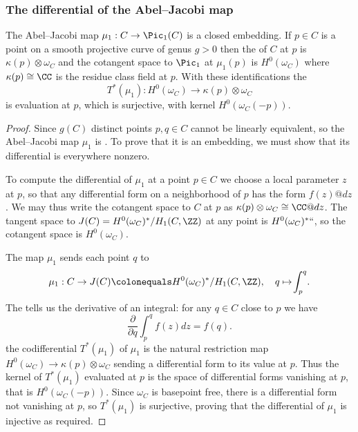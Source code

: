 \subsubsection*{The differential of the Abel--Jacobi map}

\begin{theorem}
The Abel--Jacobi map 
%
$\mu_{1}: C\to \Pic_{1}(C)$ is a closed embedding.  
If $p\in C$ is a point on a smooth projective curve of genus $g>0$ then the 
%
of $C$
at $p$ is $\kappa(p) \otimes \omega_{C}$ and the cotangent space to $\Pic_{1}$ at $\mu_{1}(p)$ is
$H^{0}(\omega_{C})$ where $\kappa(p) \cong \CC$ is the residue class
field at $p$. With these identifications the 
%
$$
T^{*}(\mu_{1}): H^{0}(\omega_{C})  \to \kappa(p) \otimes \omega_{C}
$$
is evaluation at $p$, which is surjective, with kernel 
$H^{0}(\omega_{C}(-p))$. 
\end{theorem}


\begin{proof}
Since $g(C)$
distinct points $p, q \in C$ cannot be linearly equivalent, so the
Abel--Jacobi map $\mu_1$ is 
. To prove that it is an embedding, we must show
that its differential is
everywhere nonzero.

To compute the differential of $\mu_1$ at a point $p\in C$ we choose a
local parameter $z$ at $p$, so that any differential form on a
neighborhood of $p$ has the form $f(z)@dz$. We may thus write the
cotangent space to $C$ at $p$ as
$\kappa(p) \otimes \omega_{C} \cong \CC@dz$. The tangent space to
$J(C) = H^0(\omega_C)^*/H_1(C, \ZZ)$ at any point is
$H^0(\omega_C)^*` `$, so the 
%
cotangent space
is $H^0(\omega_C)$.

The map $\mu_{1}$ sends each point $q$ to
\vspace*{-2pt}
$$
\mu_1 : C \to J(C) \colonequals H^0(\omega_C)^*/H_1(C, \ZZ),  
\quad q \mapsto \!\int_p^q \!.
\vspace*{-2pt}
$$
The 
%
tells us the derivative of an integral: 
for any $q\in C$ close to $p$ we have
$$
\frac{\partial}{\partial q} \int_p^q \!f(z)dz = f(q).
$$
the 
%
codifferential 
$T^*(\mu_1)$ of $\mu_1$ is the natural restriction map $H^0(\omega_{C}) \to \kappa(p) \otimes \omega_{C}$ sending
a differential form to its value at $p$. Thus the kernel of $T^*(\mu_1)$ evaluated at $p$ is the space of differential forms vanishing
at $p$, that is
$H^{0}(\omega_{C}(-p))$. Since $\omega_{C}$ is basepoint free, there is a differential form not vanishing at $p$,
so  $T^*(\mu_1)$ is surjective, proving that
the differential of $\mu_{1}$ is injective as required.
\end{proof}


